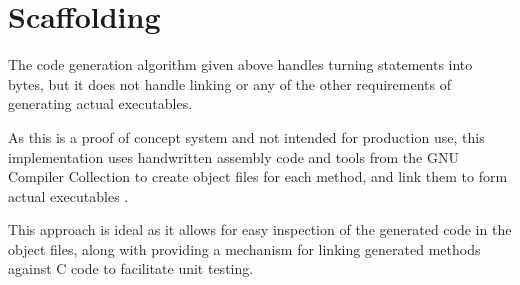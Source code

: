     \section{Scaffolding}

    The code generation algorithm given above handles turning statements into
    bytes, but it does not handle linking or any of the other requirements of
    generating actual executables.

%    

    As this is a proof of concept system and not intended for production use,
    this implementation uses handwritten assembly code and tools from the GNU
    Compiler Collection to create object files for each method, and link them to
    form actual executables \cite{gcc}.

    This approach is ideal as it allows for easy inspection of the generated
    code in the object files, along with providing a mechanism for linking
    generated methods against C code to facilitate unit testing.
